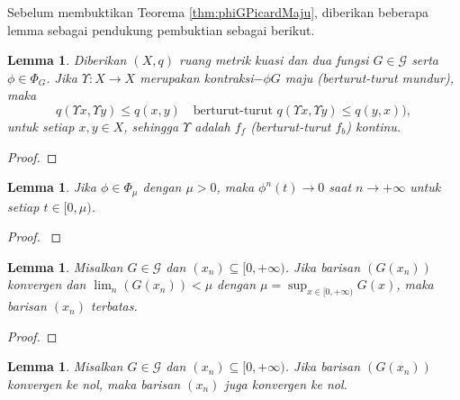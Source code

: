 \documentclass[journal]{IEEEtran}
\newtheorem{lemmas}[defn]{Lemma}
\theoremstyle{definition}
\theoremstyle{definition}
\theoremstyle{plain}
\begin{document}
Sebelum membuktikan Teorema \ref{thm:phiGPicardMaju}, diberikan beberapa lemma sebagai pendukung pembuktian sebagai berikut.

\begin{lemmas}\label{lemma:UpsilonKontinu}
    Diberikan $(X,q)$ ruang metrik kuasi dan dua fungsi $G\in\mathcal{G}$ serta $\phi\in \Phi_{G}$. Jika $\Upsilon: X\rightarrow X$ merupakan kontraksi$-\phi G$ maju (berturut-turut mundur), maka 
    \begin{equation}
        q(\Upsilon x,\Upsilon y)\leq q(x,y)\quad \text{berturut-turut } q(\Upsilon x,\Upsilon y)\leq q(y,x)),
    \end{equation}
    untuk setiap $x,y\in X$, sehingga $\Upsilon$ adalah $f_f$ (berturut-turut $f_b$) kontinu.
\end{lemmas}

\begin{proof}
\end{proof}



\begin{lemmas}\label{lemma:phin0}
Jika $\phi\in \Phi_{\mu}$ dengan $\mu>0$, maka $\phi^n(t)\rightarrow 0$ saat $n\rightarrow +\infty$ untuk setiap $t\in[0,\mu)$.
\end{lemmas}
\begin{proof}\label{}
\end{proof}

\begin{lemmas}\label{lemma:Gxnxnterbatas}
    Misalkan $G\in\mathcal{G}$ dan $(x_n)\subseteq [0,+\infty)$. Jika barisan $(G(x_n))$ konvergen dan $\lim_n(G(x_n))<\mu$ dengan $\mu=\sup_{x\in[0,+\infty)}G(x)$, maka barisan $(x_n)$ terbatas.
\end{lemmas}

\begin{proof}
\end{proof}

\begin{lemmas}\label{lemma:Gxnkonvergen0}
     Misalkan $G\in\mathcal{G}$ dan $(x_n)\subseteq [0,+\infty)$. Jika barisan $(G(x_n))$ konvergen ke nol, maka barisan $(x_n)$ juga konvergen ke nol.
\end{lemmas}
\end{document}
